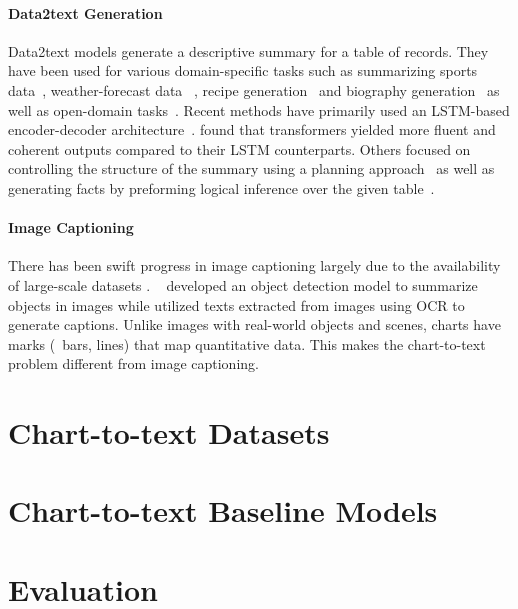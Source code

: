 \documentclass[11pt]{article}
\newcommand{\change}[1]{{\leavevmode\color{black}#1}}%
\begin{document}
\paragraph{Data2text Generation}
Data2text models generate a descriptive summary for a table of records. They have been used for various domain-specific tasks such as summarizing sports data~\cite{barzilay-lapata-2005-collective,  
wiseman2017challenges}, weather-forecast data
~\cite{reiter2005choosing}, recipe generation~\cite{yang2017reference} and biography generation~\cite{lebret-etal-2016-neural} as well as open-domain tasks~\cite{parikh2020totto, chen2020logical}. Recent methods have primarily used an LSTM-based encoder-decoder architecture~\cite{mei2016talk, lebret-etal-2016-neural, wiseman2017challenges}.  \citet{gong-etal-2019-enhanced} found that transformers \cite{Vaswani2017attn} yielded more fluent and coherent outputs compared to their LSTM counterparts. Others focused on \change{controlling the structure of the summary using a planning approach~\cite{su2021plangen} as well as generating facts by preforming logical inference over the given table~\cite{chen2020logical,chen-etal-2020-logic2text}.} 

\paragraph{Image Captioning}
There has been swift progress 
in image captioning largely due to the availability of large-scale datasets \cite{agrawal2019nocaps, chen2015microsoft}.  ~\citet{zhang2021vinvl} developed an 
object detection model to summarize objects in images while 
\citet{sidorov2020textcaps} utilized texts extracted from images using OCR  to generate captions. 
Unlike images with real-world objects and scenes, charts have marks (\eg\ bars,  lines) that map quantitative data. This makes the chart-to-text problem different from image captioning. 


\section{Chart-to-text Datasets}



\section{Chart-to-text Baseline Models}




\section{Evaluation}

\end{document}
